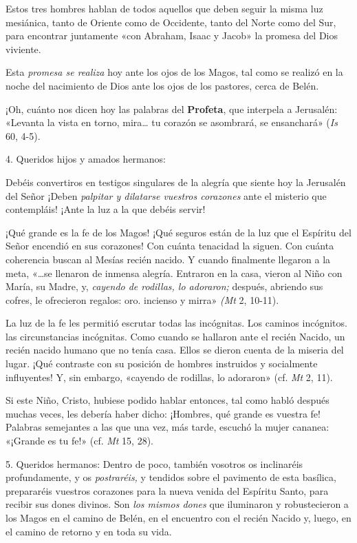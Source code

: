 \documentclass[]{article}
\begin{document}
Estos tres hombres hablan de todos aquellos que deben seguir la misma
luz mesiánica, tanto de Oriente como de Occidente, tanto del Norte como
del Sur, para encontrar juntamente «con Abraham, Isaac y Jacob» la
promesa del Dios viviente.

Esta \emph{promesa se realiza} hoy ante los ojos de los Magos, tal como
se realizó en la noche del nacimiento de Dios ante los ojos de los
pastores, cerca de Belén.

¡Oh, cuánto nos dicen hoy las palabras del \textbf{Profeta}, que
interpela a Jerusalén: «Levanta la vista en torno, mira\ldots{} tu
corazón se asombrará, se ensanchará» (\emph{Is} 60, 4-5).

4. Queridos hijos y amados hermanos:

Debéis convertiros en testigos singulares de la alegría que siente hoy
la Jerusalén del Señor ¡Deben \emph{palpitar y dilatarse vuestros
corazones} ante el misterio que contempláis! ¡Ante la luz a la que
debéis servir!

¡Qué grande es la fe de los Magos! ¡Qué seguros están de la luz que el
Espíritu del Señor encendió en sus corazones! Con cuánta tenacidad la
siguen. Con cuánta coherencia buscan al Mesías recién nacido. Y cuando
finalmente llegaron a la meta, «\ldots{}se llenaron de inmensa alegría.
Entraron en la casa, vieron al Niño con María, su Madre, y,
\emph{cayendo de rodillas, lo adoraron;} después, abriendo sus cofres,
le ofrecieron regalos: oro. incienso y mirra» \emph{(Mt} 2, 10-11).

La luz de la fe les permitió escrutar todas las incógnitas. Los caminos
incógnitos. las circunstancias incógnitas. Como cuando se hallaron ante
el recién Nacido, un recién nacido humano que no tenía casa. Ellos se
dieron cuenta de la miseria del lugar. ¡Qué contraste con su posición de
hombres instruidos y socialmente influyentes! Y, sin embargo, «cayendo
de rodillas, lo adoraron» (cf. \emph{Mt} 2, 11).

Si este Niño, Cristo, hubiese podido hablar entonces, tal como habló
después muchas veces, les debería haber dicho: ¡Hombres, qué grande es
vuestra fe! Palabras semejantes a las que una vez, más tarde, escuchó la
mujer cananea: «¡Grande es tu fe!» (cf. \emph{Mt} 15, 28).

5. Queridos hermanos: Dentro de poco, también vosotros os inclinaréis
profundamente, y os \emph{postraréis,} y tendidos sobre el pavimento de
esta basílica, prepararéis vuestros corazones para la nueva venida del
Espíritu Santo, para recibir sus dones divinos. Son \emph{los mismos
dones} que iluminaron y robustecieron a los Magos en el camino de Belén,
en el encuentro con el recién Nacido y, luego, en el camino de retorno y
en toda su vida.
\end{document}
